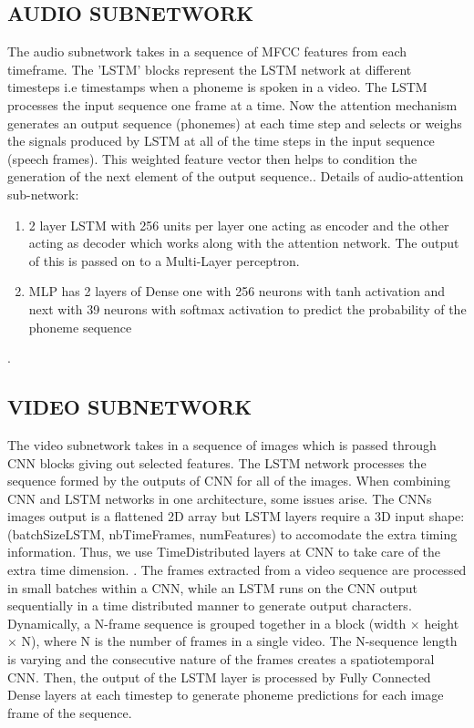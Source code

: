 \documentclass{article}
\begin{document}
\subsection{AUDIO SUBNETWORK}
The audio subnetwork takes in a sequence of MFCC features from each timeframe. The 'LSTM' blocks represent the LSTM network at different timesteps i.e timestamps when a phoneme is spoken in a video. The LSTM processes the input sequence one frame at a time. 
Now the attention mechanism\cite{Speech_Attention} generates an output sequence (phonemes) at each time step and selects or weighs the signals produced by LSTM at all of the time steps in the input sequence (speech frames). This weighted feature vector then helps to condition the generation of the next element of the output sequence.\cite{Attention_LSTM}.
\newline
Details of audio-attention sub-network:
\begin{enumerate}
    \item 2 layer LSTM with 256 units per layer one acting as encoder and the other acting as decoder\cite{Attention_Medium} which works along with the attention network\cite{Attention_ML}. The output of this is passed on to a Multi-Layer perceptron.
    \item MLP has 2 layers of Dense one with 256 neurons with tanh activation and next with 39 neurons with softmax activation to predict the probability of the phoneme sequence
\end{enumerate}.


\subsection{VIDEO SUBNETWORK}
The video subnetwork takes in a sequence of images which is passed through CNN blocks giving out selected features. The LSTM network processes the sequence formed by the outputs of CNN for all of the images. When combining CNN and LSTM networks in one architecture, some issues arise. The CNNs images output is a flattened 2D array but LSTM layers require a 3D input shape: (batchSizeLSTM, nbTimeFrames, numFeatures) to accomodate the extra timing information. Thus, we use TimeDistributed layers at CNN to take care of the extra time dimension. \cite{LAS}.
The frames extracted from a video sequence are processed in small batches within a CNN, while an LSTM runs on the CNN output sequentially in a time distributed manner to generate output characters. Dynamically, a N-frame sequence is grouped together in a block (width $\times$ height $\times$ N), where N is the number of frames in a single video. The N-sequence length is varying and the consecutive nature of the frames creates a spatiotemporal CNN.\cite{LIPNET} Then, the output of the LSTM layer is processed by Fully Connected Dense layers at each timestep to generate phoneme predictions for each image frame of the sequence.\cite{speechDecoding}
\end{document}
